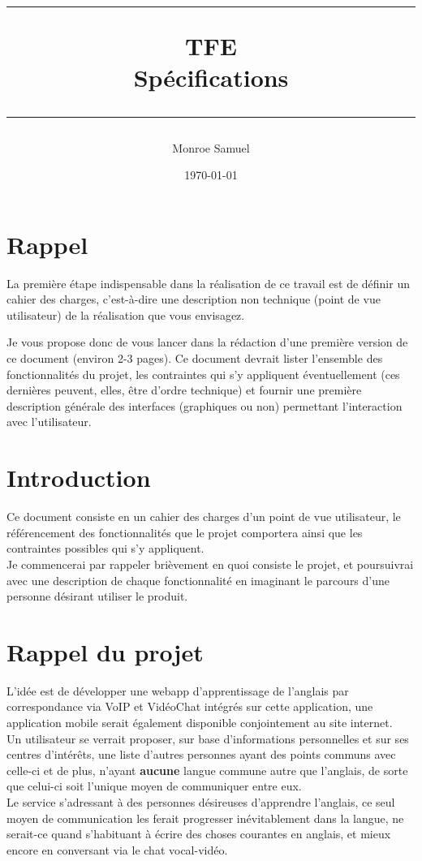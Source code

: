 \documentclass[a4paper,10pt,final,fleqn]{article}
\title{
\parbox{15cm}
{ %
  \vspace{3cm}
	\begin{center}\sf\bfseries\Huge
		\rule{15cm}{1pt}
		\medskip
		TFE \\
		\huge Spécifications
		\vspace{.5cm}
		\rule{15cm}{1pt}
	\end{center}
	\vspace{3cm}
 }}
\author{Monroe Samuel}
\date{\today}
\begin{document}
\maketitle
\newpage

	\section{Rappel}

		La première étape indispensable dans la réalisation de ce travail est de définir un cahier des charges, c’est-à-dire une description non technique (point de vue utilisateur) de la réalisation que vous envisagez.

		Je vous propose donc de vous lancer dans la rédaction d’une première version de ce document (environ 2-3 pages).  Ce document devrait lister l’ensemble des fonctionnalités du projet, les contraintes qui s’y appliquent éventuellement (ces dernières peuvent, elles, être d’ordre technique) et fournir une première description générale des interfaces (graphiques ou non) permettant l’interaction avec l’utilisateur.

	\section{Introduction}

		Ce document consiste en un cahier des charges d'un point de vue utilisateur, le référencement des fonctionnalités que le projet comportera ainsi que les contraintes possibles qui s'y appliquent.\\

		Je commencerai par rappeler brièvement en quoi consiste le projet, et poursuivrai avec une description de chaque fonctionnalité en imaginant le parcours d'une personne désirant utiliser le produit.\\

	\section{Rappel du projet}

		L'idée est de développer une webapp d'apprentissage de l'anglais par correspondance via VoIP et VidéoChat intégrés sur cette application, une application mobile serait également disponible conjointement au site internet.\\

		Un utilisateur se verrait proposer, sur base d'informations personnelles et sur ses centres d'intérêts, une liste d'autres personnes ayant des points communs avec celle-ci et de plus, n'ayant \textbf{aucune} langue commune autre que l'anglais, de sorte que celui-ci soit l'unique moyen de communiquer entre eux.\\
		Le service s'adressant à des personnes désireuses d'apprendre l'anglais, ce seul moyen de communication les ferait progresser inévitablement dans la langue, ne serait-ce quand s'habituant à écrire des choses courantes en anglais, et mieux encore en conversant via le chat vocal-vidéo.\\
\end{document}
